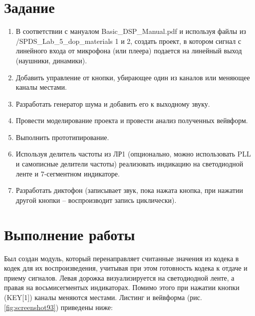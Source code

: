 \documentclass[a4paper,14pt]{article}
\begin{document}
	
	\tableofcontents
	\pagebreak
	\section{Задание}
	
	\begin{enumerate}
		\item В соответствии с мануалом Basic\_DSP\_Manual.pdf и используя файлы из /SPDS\_Lab\_5\_dop\_materials 1 и 2, создать проект, в котором сигнал с линейного входа от микрофона (или плеера) подается на линейный выход (наушники, динамики).
		
		\item Добавить управление от кнопки, убирающее один из каналов или меняющее каналы местами.
		
		\item Разработать генератор шума и добавить его к выходному звуку.
		
		\item Провести моделирование проекта и провести анализ полученных вейвформ.
		
		\item Выполнить прототипирование.
		
		\item Используя делитель частоты из ЛР1 (опционально, можно использовать PLL и самописные делители частоты) реализовать индикацию на светодиодной ленте и 7-сегментном индикаторе.
		
		\item Разработать диктофон (записывает звук, пока нажата кнопка, при нажатии другой кнопки – воспроизводит запись циклически).
		
		
	\end{enumerate}

	
	\section{Выполнение работы}
	
		Был создан модуль, который перенаправляет считанные значения из кодека в кодек для их воспроизведения, учитывая при этом готовность кодека к отдаче и приему сигналов.
		Левая дорожка визуализируется на светодиодной ленте, а правая на восьмисегментых индикаторах.
		Помимо этого при нажатии кнопки (KEY[1]) каналы меняются местами.
		Листинг и вейвформа (рис. \ref{fig:screenshot93}) приведены ниже:
		
\end{document}
